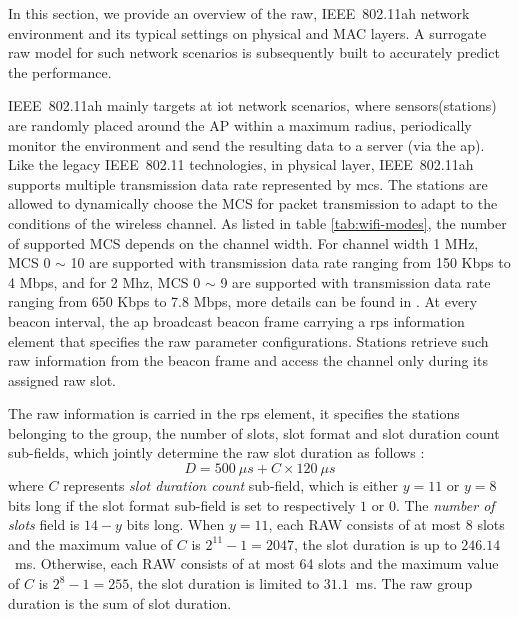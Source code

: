 In this section, we provide an overview of the \gls{raw}, IEEE~802.11ah network environment and its typical settings on physical and MAC layers. A surrogate \gls{raw} model for such network scenarios is subsequently built to accurately predict the performance.



IEEE~802.11ah mainly targets at \gls{iot} network scenarios, where sensors(stations) are randomly placed around the AP within a maximum radius, periodically monitor the environment and send the resulting data to a server (via the \gls{ap}). Like the legacy IEEE~802.11 technologies, in physical layer, IEEE~802.11ah supports multiple transmission data rate represented by \gls{mcs}. The stations are allowed to dynamically choose the MCS for packet transmission to adapt to the conditions of the wireless channel. As listed in table \ref{tab:wifi-modes}, the number of supported MCS depends on the channel width. For channel width 1 MHz,  MCS 0 $\sim$ 10 are supported with transmission data rate ranging from 150 Kbps to 4 Mbps, and for 2 Mhz, MCS 0 $\sim$ 9 are supported with transmission data rate ranging from 650 Kbps to 7.8 Mbps, more details can be found in \cite{80211ahStd}. At every beacon interval, the \gls{ap} broadcast beacon frame carrying a \gls{rps} information element that specifies the \gls{raw} parameter configurations. Stations retrieve such \gls{raw} information from the beacon frame and access the channel only during its assigned \gls{raw} slot. 


The \gls{raw} information is carried in the \gls{rps} element, it specifies the stations belonging to the group, the number of slots, slot format and slot duration count sub-fields, which jointly determine the \gls{raw} slot duration as follows \cite{80211ahStd}: 
\begin{equation} \label{eq:Duration}
D = 500~\mu{}s + C \times 120~\mu{}s  
\end{equation}
where $C$ represents \textit{slot duration count} sub-field, which is either $y = 11$ or $y = 8$ bits long if the slot format sub-field is set to respectively $1$ or $0$. The \textit{number of slots} field is $14-y$ bits long. When $y = 11$, each RAW consists of at most 8 slots and the maximum value of $C$ is $2^{11}-1=2047$, the slot duration is up to $246.14$~ms. Otherwise, each RAW consists of at most 64 slots and the maximum value of $C$ is $2^{8}-1=255$, the slot duration is limited to $31.1$~ms. The \gls{raw} group duration is the sum of slot duration.



